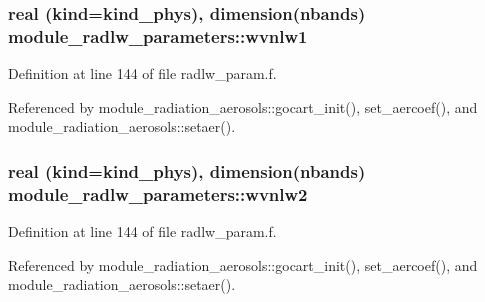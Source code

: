 \subsubsection[{\texorpdfstring{wvnlw1}{wvnlw1}}]{\setlength{\rightskip}{0pt plus 5cm}real (kind=kind\+\_\+phys), dimension({\bf nbands}) module\+\_\+radlw\+\_\+parameters\+::wvnlw1}\hypertarget{namespacemodule__radlw__parameters_a3a7370a94889d0cbaf6057404830d978}{}\label{namespacemodule__radlw__parameters_a3a7370a94889d0cbaf6057404830d978}


Definition at line 144 of file radlw\+\_\+param.\+f.



Referenced by module\+\_\+radiation\+\_\+aerosols\+::gocart\+\_\+init(), set\+\_\+aercoef(), and module\+\_\+radiation\+\_\+aerosols\+::setaer().

\subsubsection[{\texorpdfstring{wvnlw2}{wvnlw2}}]{\setlength{\rightskip}{0pt plus 5cm}real (kind=kind\+\_\+phys), dimension({\bf nbands}) module\+\_\+radlw\+\_\+parameters\+::wvnlw2}\hypertarget{namespacemodule__radlw__parameters_ace30abd03d144096ee6b444b46081b58}{}\label{namespacemodule__radlw__parameters_ace30abd03d144096ee6b444b46081b58}


Definition at line 144 of file radlw\+\_\+param.\+f.



Referenced by module\+\_\+radiation\+\_\+aerosols\+::gocart\+\_\+init(), set\+\_\+aercoef(), and module\+\_\+radiation\+\_\+aerosols\+::setaer().

